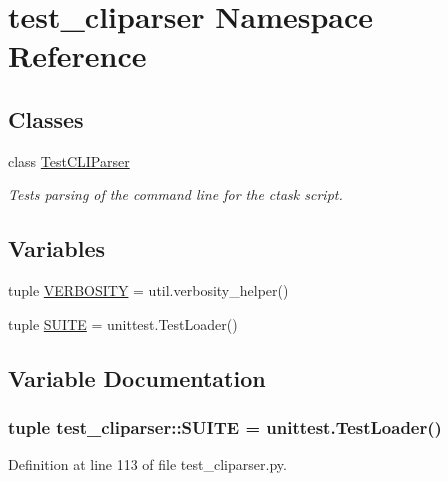 \hypertarget{namespacetest__cliparser}{
\section{test\-\_\-cliparser \-Namespace \-Reference}
\label{namespacetest__cliparser}
}
\subsection*{\-Classes}
\begin{DoxyCompactItemize}
\item 
class \hyperlink{classtest__cliparser_1_1TestCLIParser}{\-Test\-C\-L\-I\-Parser}
\begin{DoxyCompactList}\small\item\em \-Tests parsing of the command line for the ctask script. \end{DoxyCompactList}\end{DoxyCompactItemize}
\subsection*{\-Variables}
\begin{DoxyCompactItemize}
\item 
tuple \hyperlink{namespacetest__cliparser_a05eba1500250a44deba6212dafcece55}{\-V\-E\-R\-B\-O\-S\-I\-T\-Y} = util.\-verbosity\-\_\-helper()
\item 
tuple \hyperlink{namespacetest__cliparser_aa23a2bb2950fb185adc4a815dd069360}{\-S\-U\-I\-T\-E} = unittest.\-Test\-Loader()
\end{DoxyCompactItemize}


\subsection{\-Variable \-Documentation}
\hypertarget{namespacetest__cliparser_aa23a2bb2950fb185adc4a815dd069360}{
\subsubsection[{\-S\-U\-I\-T\-E}]{\setlength{\rightskip}{0pt plus 5cm}tuple {\bf test\-\_\-cliparser\-::\-S\-U\-I\-T\-E} = unittest.\-Test\-Loader()}}
\label{namespacetest__cliparser_aa23a2bb2950fb185adc4a815dd069360}


\-Definition at line 113 of file test\-\_\-cliparser.\-py.

